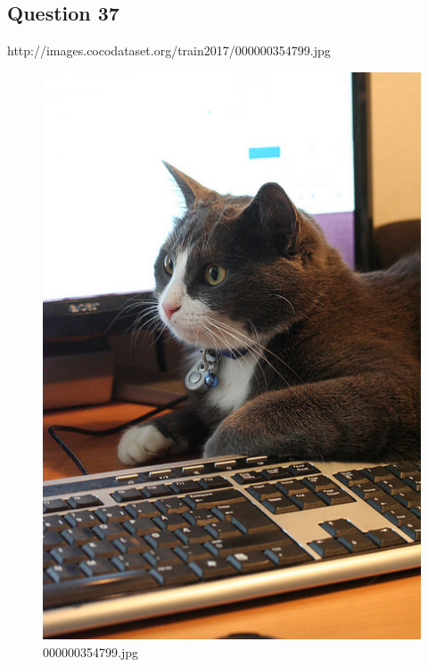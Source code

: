     \subsection*{Question 37}
    http://images.cocodataset.org/train2017/000000354799.jpg
    \begin{figure}[h]
        \centering
        \includegraphics[width=0.8\linewidth]{../image set/easy/000000354799.jpg}
        \caption{000000354799.jpg}
    \end{figure}
